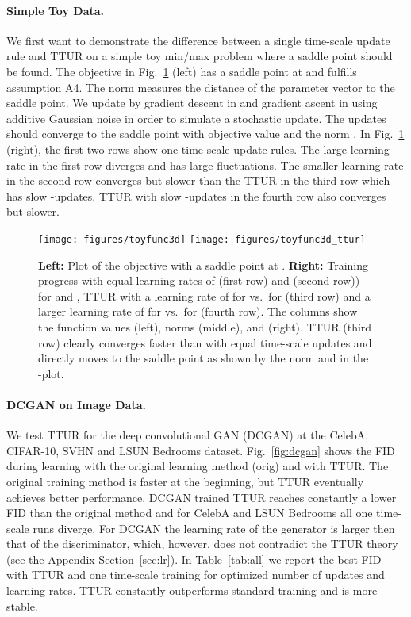 \documentclass{article}
\begin{document}
\paragraph{Simple Toy Data.}

We first want to demonstrate the difference between a single time-scale
update rule and TTUR on a simple toy min/max problem where a saddle point
should be found.
The objective  in Fig.~\ref{fig:toy1}
(left) has a saddle point at  and fulfills assumption A4. The norm
 measures the distance of the parameter vector  to the saddle point.
We update  by gradient descent in  and gradient ascent in
 using additive Gaussian noise in order to simulate a stochastic update.
The updates should converge to the saddle point 
with objective value  and the norm .
In Fig.~\ref{fig:toy1} (right),
the first two rows show one time-scale update rules.
The large learning rate in the first row diverges and has large
fluctuations. The smaller
learning rate in the second row converges but slower than
the TTUR in the third row which has slow -updates. TTUR with slow
-updates in the fourth row also converges but slower.

 \begin{figure}[H] \centering
\texttt{[image: figures/toyfunc3d]}
\texttt{[image: figures/toyfunc3d\_ttur]}
\caption[TTUR and single time-scale update with toy data.]{{\bf Left:} Plot of
the objective with a saddle point at . {\bf Right:} Training progress with equal learning rates
of  (first row) and  (second row)) for  and , TTUR with a
learning rate of  for  vs.\  for  (third row) and a larger
learning rate of  for  vs.\  for  (fourth row). The columns
show the function values (left), norms (middle), and
 (right). TTUR (third row) clearly converges faster than with equal
time-scale updates and directly moves to the saddle point as shown by the norm
and in the -plot.
\label{fig:toy1} }
\end{figure}

\paragraph{DCGAN on Image Data.}

We test TTUR for the deep convolutional GAN (DCGAN) \cite{Radford:15} at the
CelebA, CIFAR-10, SVHN and LSUN Bedrooms dataset. Fig.~\ref{fig:dcgan} shows
the FID during learning with the original learning method (orig) and with TTUR.
The original training method is faster at the beginning, but TTUR
eventually achieves better performance. DCGAN trained TTUR
reaches constantly a lower FID than the original method and for CelebA and LSUN
Bedrooms all one time-scale runs diverge. For DCGAN the learning rate of the
generator is larger then that of the discriminator, which, however, does not contradict
the TTUR theory (see the Appendix Section~\ref{sec:lr}). In
Table~\ref{tab:all} we report the best FID with TTUR and
one time-scale training for optimized number of updates and learning
rates. TTUR constantly outperforms standard training and is more stable.
\end{document}

